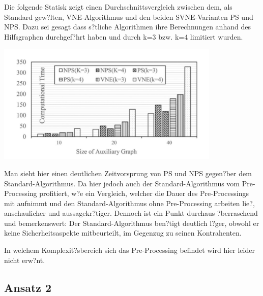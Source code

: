 \documentclass{lni}
\begin{document}
Die folgende Statisk zeigt einen Durchschnittsvergleich zwischen dem, als Standard gew?lten, VNE-Algorithmus\cite{Std} und den beiden SVNE-Varianten PS und NPS. Dazu sei gesagt dass s?tliche Algorithmen ihre Berechnungen anhand des Hilfsgraphen durchgef?hrt haben und durch k=3 bzw. k=4 limitiert wurden.\newline
\begin{center}
	\includegraphics[width=0.8\textwidth]{statistic.pdf}\newline
\end{center}
Man sieht  hier einen deutlichen Zeitvorsprung von PS und NPS gegen?ber dem Standard-Algorithmus. Da hier jedoch auch der Standard-Algorithmus vom Pre-Processing profitiert, w?e ein Vergleich, welcher die Dauer des Pre-Processings mit aufnimmt und den Standard-Algorithmus ohne Pre-Processing arbeiten lie?, anschaulicher und aussagekr?tiger.
Dennoch ist ein Punkt durchaus ?berraschend und bemerkenswert: Der Standard-Algorithmus ben?tigt deutlich l?ger, obwohl er keine Sicherheitsaspekte mitbeurteilt, im Gegenzug zu seinen Kontrahenten.

In welchem Komplexit?sbereich sich das Pre-Processing befindet wird hier leider nicht erw?nt.


\subsection{Ansatz 2}
\end{document}
